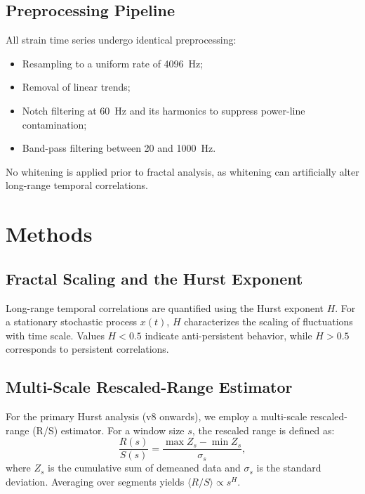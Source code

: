 \documentclass[11pt,a4paper]{article}
\begin{document}
\subsection{Preprocessing Pipeline}
All strain time series undergo identical preprocessing:
\begin{itemize}[leftmargin=1.5em]
\item Resampling to a uniform rate of 4096~Hz;
\item Removal of linear trends;
\item Notch filtering at 60~Hz and its harmonics to suppress power-line contamination;
\item Band-pass filtering between 20 and 1000~Hz.
\end{itemize}

No whitening is applied prior to fractal analysis, as whitening can artificially alter long-range temporal correlations.

\section{Methods}

\subsection{Fractal Scaling and the Hurst Exponent}
Long-range temporal correlations are quantified using the Hurst exponent $H$. For a stationary stochastic process $x(t)$, $H$ characterizes the scaling of fluctuations with time scale. Values $H<0.5$ indicate anti-persistent behavior, while $H>0.5$ corresponds to persistent correlations.

\subsection{Multi-Scale Rescaled-Range Estimator}
For the primary Hurst analysis (v8 onwards), we employ a multi-scale rescaled-range (R/S) estimator. For a window size $s$, the rescaled range is defined as:
\begin{equation}
\frac{R(s)}{S(s)} = \frac{\max Z_s - \min Z_s}{\sigma_s},
\end{equation}
where $Z_s$ is the cumulative sum of demeaned data and $\sigma_s$ is the standard deviation. Averaging over segments yields $\langle R/S \rangle \propto s^H$.
\end{document}
